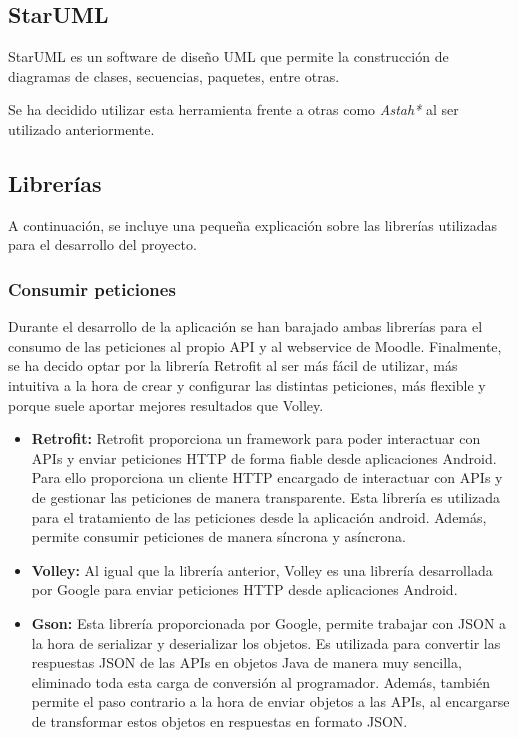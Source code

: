\subsection{StarUML}

StarUML es un software de diseño UML que permite la construcción de diagramas de clases, secuencias, paquetes, entre otras. \cite{wiki:staruml}

Se ha decidido utilizar esta herramienta frente a otras como \emph{Astah*} \cite{wiki:astah} al ser utilizado anteriormente.

\subsection{Librerías}

A continuación, se incluye una pequeña explicación sobre las librerías utilizadas para el desarrollo del proyecto.

\subsubsection{Consumir peticiones}

Durante el desarrollo de la aplicación se han barajado ambas librerías para el consumo de las peticiones al propio API y al webservice de Moodle. Finalmente, se ha decido optar por la librería Retrofit al ser más fácil de utilizar, más intuitiva a la hora de crear y configurar las distintas peticiones, más flexible y porque suele aportar mejores resultados que Volley.

\begin{itemize}

	\item \textbf{Retrofit:} Retrofit proporciona un framework para poder interactuar con APIs y enviar peticiones HTTP de forma fiable desde aplicaciones Android. Para ello proporciona un cliente HTTP encargado de interactuar con APIs y de gestionar las peticiones de manera transparente.
Esta librería es utilizada para el tratamiento de las peticiones desde la aplicación android. Además, permite consumir peticiones de manera síncrona y asíncrona. \cite{wiki:retrofit}
	
	\item \textbf{Volley:} Al igual que la librería anterior, Volley es una librería desarrollada por Google para enviar peticiones HTTP desde aplicaciones Android. \cite{wiki:book} \cite{wiki:volley} 
	
	\item \textbf{Gson:} Esta librería proporcionada por Google, permite trabajar con JSON a la hora de serializar y deserializar los objetos. Es utilizada para convertir las respuestas JSON de las APIs en objetos Java de manera muy sencilla, eliminado toda esta carga de conversión al programador. Además, también permite el paso contrario a la hora de enviar objetos a las APIs, al encargarse de transformar estos objetos en respuestas en formato JSON. \cite{wiki:gson}

\end{itemize}

